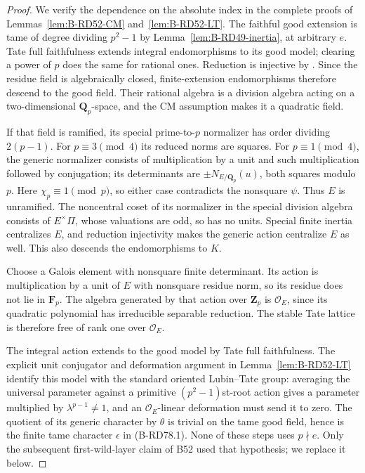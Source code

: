 \begin{proof}
We verify the dependence on the absolute index in the complete
proofs of Lemmas~\ref{lem:B-RD52-CM} and~\ref{lem:B-RD52-LT}.
The faithful good extension is tame of degree dividing
\(p^2-1\) by Lemma~\ref{lem:B-RD49-inertia}, at arbitrary
\(e\). Tate full faithfulness extends integral endomorphisms
to its good model; clearing a power of \(p\) does the same
for rational ones. Reduction is injective by
\cite[Proposition~4.2 and proof]{HopkinsGross1994Bundles}.
Since the residue field is algebraically closed, finite-extension
endomorphisms therefore descend to the good field. Their
rational algebra is a division algebra acting on a two-dimensional
\(\mathbf Q_p\)-space, and the CM assumption makes it a
quadratic field.

If that field is ramified, its special prime-to-\(p\) normalizer
has order dividing \(2(p-1)\). For \(p\equiv3\pmod4\)
its reduced norms are squares. For \(p\equiv1\pmod4\), the
generic normalizer consists of multiplication by a unit and
such multiplication followed by conjugation; its determinants
are \(\pm N_{E/\mathbf Q_p}(u)\), both squares modulo \(p\).
Here \(\chi_p\equiv1\pmod p\), so either case contradicts
the nonsquare \(\psi\). Thus \(E\) is unramified.
The noncentral coset of its normalizer in the special division
algebra consists of \(E^\times\Pi\), whose valuations are
odd, so has no units. Special finite inertia centralizes \(E\),
and reduction injectivity makes the generic action centralize
\(E\) as well. This also descends the endomorphisms to \(K\).

Choose a Galois element with nonsquare finite determinant.
Its action is multiplication by a unit of \(E\) with nonsquare
residue norm, so its residue does not lie in \(\mathbf F_p\).
The algebra generated by that action over \(\mathbf Z_p\)
is \(\mathcal O_E\), since its quadratic polynomial has
irreducible separable reduction. The stable Tate lattice is
therefore free of rank one over \(\mathcal O_E\).

The integral action extends to the good model by Tate full
faithfulness. The explicit unit conjugator and deformation
argument in Lemma~\ref{lem:B-RD52-LT} identify this model with
the standard oriented Lubin--Tate group: averaging the universal
parameter against a primitive \((p^2-1)\)st-root action gives
a parameter multiplied by \(\lambda^{p-1}\ne1\), and an
\(\mathcal O_E\)-linear deformation must send it to zero.
The quotient of its generic character by \(\theta\) is trivial
on the tame good field, hence is the finite tame character
\(\epsilon\) in (B-RD78.1). None of these steps uses
\(p\nmid e\). Only the subsequent first-wild-layer claim
of B52 used that hypothesis; we replace it below.
\end{proof}

